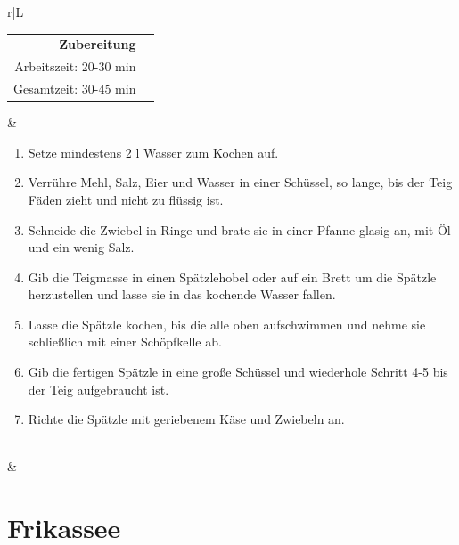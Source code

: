 \documentclass[a4paper, 12pt]{scrbook} 								%
\numberwithin{equation}{section} 									%
\begin{document}
	\begin{tabularx}{\textwidth}{r|L}

		\begin{tabular}[t]{rr}
			\textbf{Zubereitung}	\\
			Arbeitszeit: 20-30 min	\\
			Gesamtzeit:	30-45 min	\\
		\end{tabular}			&	\begin{enumerate}[nosep]
										\item Setze mindestens 2 l Wasser zum Kochen auf.
										\item Verrühre Mehl, Salz, Eier und Wasser in einer Schüssel, so lange, bis der Teig Fäden zieht und nicht zu flüssig ist.
										\item Schneide die Zwiebel in Ringe und brate sie in einer Pfanne glasig an, mit Öl und ein wenig Salz.
										\item Gib die Teigmasse in einen Spätzlehobel oder auf ein Brett um die Spätzle herzustellen und lasse sie in das kochende Wasser fallen.
										\item Lasse die Spätzle kochen, bis die alle oben aufschwimmen und nehme sie schließlich mit einer Schöpfkelle ab.
										\item Gib die fertigen Spätzle in eine große Schüssel und wiederhole Schritt 4-5 bis der Teig aufgebraucht ist.
										\item Richte die Spätzle mit geriebenem Käse und Zwiebeln an.
									\end{enumerate}	\\
								&	\\
	\end{tabularx}
	\newpage


	\section{Frikassee}	\label{frikassee}
\end{document}
